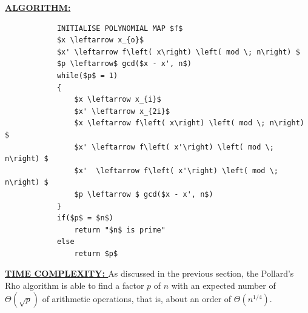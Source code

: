 \documentclass[11pt]{article}
\begin{document}
\begin{flushleft}
      \break \break
     \textbf{\underline{ALGORITHM: }}
        \begin{lstlisting}
            INITIALISE POLYNOMIAL MAP $f$
            $x \leftarrow x_{o}$
            $x' \leftarrow f\left( x\right) \left( mod \; n\right) $
            $p \leftarrow$ gcd($x - x', n$)
            while($p$ = 1)
            {
                $x \leftarrow x_{i}$
                $x' \leftarrow x_{2i}$
                $x \leftarrow f\left( x\right) \left( mod \; n\right) $
                $x' \leftarrow f\left( x'\right) \left( mod \; n\right) $
                $x'  \leftarrow f\left( x'\right) \left( mod \; n\right) $
                $p \leftarrow $ gcd($x - x', n$)
            }
            if($p$ = $n$)
                return "$n$ is prime"
            else
                return $p$
        \end{lstlisting}
    \textbf{\underline{TIME COMPLEXITY: }}\break
        As discussed in the previous section, the Pollard's Rho algorithm is able to find a factor $p$ of $n$ with an expected number of $\Theta \left( \sqrt {p}\right) $ of arithmetic operations, that is, about an order of $\Theta \left( n^{1/4}\right) $.

\end{flushleft}



\end{document}
